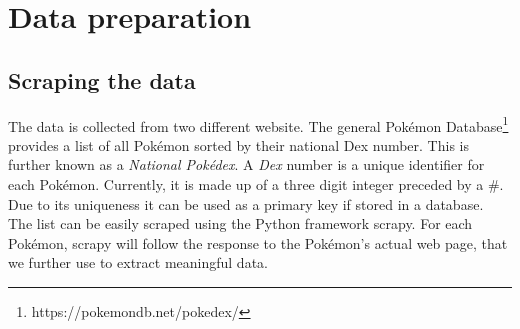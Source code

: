 \documentclass[conference]{IEEEtran}
\begin{document}
\section{Data preparation}
\subsection{Scraping the data}
\label{subsec:scraping}
The data is collected from two different website. The general Pokémon Database\footnote{https://pokemondb.net/pokedex/} provides a list of all Pokémon sorted by their national Dex number. This is further known as a \textit{National Pokédex}. A \textit{Dex} number is a unique identifier for each Pokémon. Currently, it is made up of a three digit integer preceded by a \#. Due to its uniqueness it can be used as a primary key if stored in a database. The list can be easily scraped using the Python framework scrapy. For each Pokémon, scrapy will follow the response to the Pokémon's actual web page, that we further use to extract meaningful data.
\end{document}
